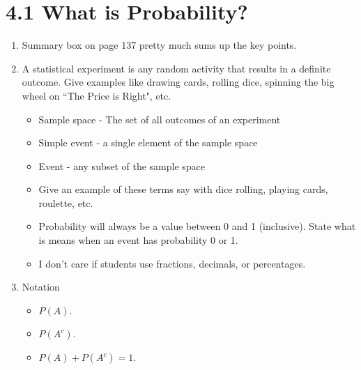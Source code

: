 \documentclass{article}
\begin{document}
\section*{4.1 What is Probability?}

\begin{enumerate}

    \item Summary box on page 137 pretty much sums up the key points.

    \item A statistical experiment is any random activity that results in a definite outcome. Give examples like drawing cards, rolling dice, spinning the big wheel on ``The Price is Right", etc.
    
        \begin{itemize}
            
            \item Sample space - The set of all outcomes of an experiment
            
            \item Simple event - a single element of the sample space
            
            \item Event - any subset of the sample space
            
            \item Give an example of these terms say with dice rolling, playing cards, roulette, etc.
            
            \item Probability will always be a value between 0 and 1 (inclusive). State what is means when an event has probability 0 or 1.
            
            \item I don’t care if students use fractions, decimals, or percentages.
            
        \end{itemize}
        
    \item Notation
    
        \begin{itemize}
            
            \item $P(A)$.
            
            \item $P(A^c)$.
            
            \item $P(A)+P(A^c)=1$.
            

\end{itemize}
\end{enumerate}
\end{document}
